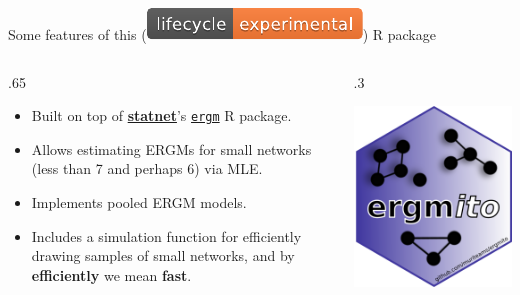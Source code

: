 \documentclass[10pt,ignorenonframetext,aspectratio=169,]{beamer}
\def\begincols{\begin{columns}[c]}
\def\begincol{\begin{column}[c]}
\def\endcol{\end{column}}
\def\endcols{\end{columns}}
\begin{document}
\begin{frame}

Some features of this
(\includegraphics[width=.1\linewidth]{lifecycle-experimental-orange.pdf})
R package

\begincols

\begincol{.65\linewidth}
\begin{itemize}
  \setlength\itemsep{.5cm}
\item<2-> Built on top of \href{https://statnet.org}{\textbf{statnet}}'s \href{https://github.com/statnet/ergm}{\texttt{ergm}} R package.

\item<3-> Allows estimating ERGMs for small networks (less than 7 and perhaps 6) via MLE.

\item<4-> Implements pooled ERGM models.

\item<5-> Includes a simulation function for efficiently drawing samples of small networks, and by \textbf{efficiently} we mean \textbf{fast}.
\end{itemize}

\endcol

\begincol{.3\linewidth}

\includegraphics{fig/logo.png}

\endcol

\endcols


\end{frame}
\end{document}
